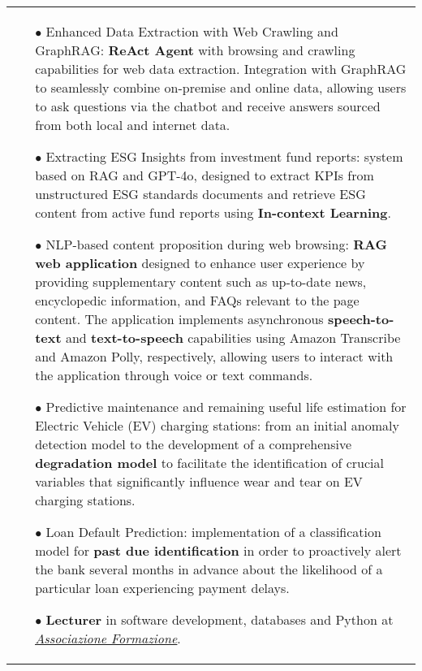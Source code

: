 \documentclass[11pt,a4paper,sans,english]{moderncv}
\makeatletter
\newcommand*{\mycvitem}[2][.25em]{%
	\vspace{-.25em}%
	\begin{tabular}{@{}p{\textwidth}@{}}%
		\small#2%
	\end{tabular}%
	\par\addvspace{-0.7em}}
\newcommand*{\cvtag}[1]{%
	\textcolor{lightgray!50!black}{\fbox{\mathstrut\scriptsize\textsf{\textbf{#1}}}}}
\makeatother
\begin{document}
	\mycvitem{%
		\vspace*{-.6cm}
		\begin{flushleft}
			\noindent
			\cvtag{Python} \cvtag{Java} \cvtag{Docker} \cvtag{Gitlab CI/CD} \cvtag{LangChain} \cvtag{Milvus} \cvtag{Amazon Web Services: EC2, S3, Lambda, Transcribe, Polly, SNS, EventBridge} \cvtag{Pandas} \cvtag{FastAPI} \cvtag{Spring Boot} \cvtag{Git} \cvtag{Keras} \cvtag{Redis}
			\cvtag{PostgreSQL} \cvtag{Keycloak} \cvtag{Mosquitto} \cvtag{KNIME} \cvtag{Nginx}
		\end{flushleft}
		\vspace*{-.2cm}
		\begin{itemize}
			\item[$\bullet$] Enhanced Data Extraction with Web Crawling and GraphRAG: \textbf{ReAct Agent} with browsing and crawling capabilities for web data extraction. Integration with GraphRAG to seamlessly combine on-premise and online data, allowing users to ask questions via the chatbot and receive answers sourced from both local and internet data.
			\item[$\bullet$] Extracting ESG Insights from investment fund reports: system based on RAG and GPT-4o, designed to extract KPIs from unstructured ESG standards documents and retrieve ESG content from active fund reports using \textbf{In-context Learning}.
			\item[$\bullet$] NLP-based content proposition during web browsing: \textbf{RAG web application} designed to enhance user experience by providing supplementary content such as up-to-date news, encyclopedic information, and FAQs relevant to the page content. The application implements asynchronous \textbf{speech-to-text} and \textbf{text-to-speech} capabilities using Amazon Transcribe and Amazon Polly, respectively, allowing users to interact with the application through voice or text commands.
			\item[$\bullet$] Predictive maintenance and remaining useful life estimation for Electric Vehicle (EV) charging stations: from an initial anomaly detection model to the development of a comprehensive \textbf{degradation model} to facilitate the identification of crucial variables that significantly influence wear and tear on EV charging stations.
			\item[$\bullet$] Loan Default Prediction: implementation of a classification model for \textbf{past due identification} in order to proactively alert the bank several months in advance about the likelihood of a particular loan experiencing payment delays.
			\item[$\bullet$] \textbf{Lecturer} in software development, databases and Python at \href{https://www.associazioneformazione.it/formazione-professionale/ifts-tecnico-per-la-progettazione-e-lo-sviluppo-di-applicazioni-informatiche}{\textit{\underline{Associazione Formazione}}}.

\end{itemize}}
\end{document}

